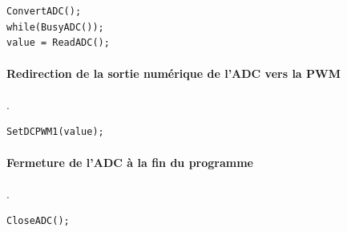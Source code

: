 \begin{lstlisting}
ConvertADC();
while(BusyADC());
value = ReadADC();
\end{lstlisting}

\paragraph{Redirection de la sortie numérique de l'ADC vers la PWM}.
\begin{lstlisting}
SetDCPWM1(value);
\end{lstlisting}

\paragraph{Fermeture de l'ADC à la fin du programme}.
\begin{lstlisting}
CloseADC();
\end{lstlisting}

